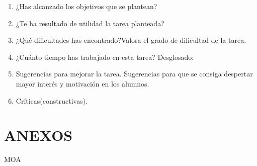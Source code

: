 \documentclass[10pt,a4paper]{article}
\begin{document}
\begin{enumerate}

	\item ¿Has alcanzado los objetivos que se plantean? 
	
	\item ¿Te ha resultado de utilidad la tarea planteada?

	\item ¿Qué dificultades has encontrado?Valora el grado de dificultad de la tarea.

	\item  ¿Cuánto tiempo has trabajado en esta tarea? Desglosado:

		\begin{table}[H]
		\centering
		\end{table}

	\item  Sugerencias para mejorar la tarea. Sugerencias para que se consiga
	despertar mayor interés y motivación en los alumnos.\par

	\item  Críticas(constructivas).

\end{enumerate} 

\newpage

\section*{ANEXOS}

\newpage



\newpage



\newpage

\begin{thebibliography}{X}
	 MOA	
	
\end{thebibliography}

\end{document}
